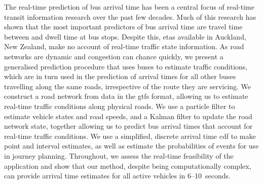 The real-time prediction of bus arrival time has been a central focus of real-time transit information research over the past few decades. Much of this research has shown that the most important predictors of bus arrival time are travel time between and dwell time at bus stops. Despite this, \glspl{eta} available in Auckland, New Zealand, make no account of real-time traffic state information. As road networks are dynamic and congestion can chance quickly, we present a generalised prediction procedure that uses buses to estimate traffic conditions, which are in turn used in the prediction of arrival times for all other buses travelling along the same roads, irrespective of the route they are servicing. We construct a road network from data in the \gls{gtfs} format, allowing us to estimate real-time traffic conditions along physical roads. We use a particle filter to estimate vehicle states and road speeds, and a Kalman filter to update the road network state, together allowing us to predict bus arrival times that account for real-time traffic conditions. We use a simplified, discrete arrival time \gls{cdf} to make point and interval estimates, as well as estimate the probabilities of events for use in journey planning. Throughout, we assess the real-time feasibility of the application and show that our method, despite being computationally complex, can provide arrival time estimates for all active vehicles in 6--10~seconds.
